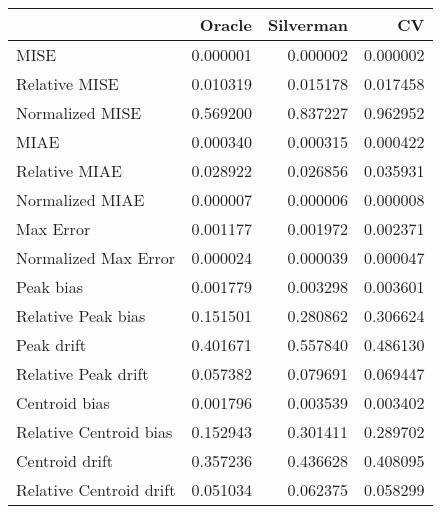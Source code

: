 \begin{tabular}{lrrr}
  \hline
 & Oracle & Silverman & CV \\ 
  \hline
MISE & 0.000001 & 0.000002 & 0.000002 \\ 
  Relative MISE & 0.010319 & 0.015178 & 0.017458 \\ 
  Normalized MISE & 0.569200 & 0.837227 & 0.962952 \\ 
  MIAE & 0.000340 & 0.000315 & 0.000422 \\ 
  Relative MIAE & 0.028922 & 0.026856 & 0.035931 \\ 
  Normalized MIAE & 0.000007 & 0.000006 & 0.000008 \\ 
  Max Error & 0.001177 & 0.001972 & 0.002371 \\ 
  Normalized Max Error & 0.000024 & 0.000039 & 0.000047 \\ 
  Peak bias & 0.001779 & 0.003298 & 0.003601 \\ 
  Relative Peak bias & 0.151501 & 0.280862 & 0.306624 \\ 
  Peak drift & 0.401671 & 0.557840 & 0.486130 \\ 
  Relative Peak drift & 0.057382 & 0.079691 & 0.069447 \\ 
  Centroid bias & 0.001796 & 0.003539 & 0.003402 \\ 
  Relative Centroid bias & 0.152943 & 0.301411 & 0.289702 \\ 
  Centroid drift & 0.357236 & 0.436628 & 0.408095 \\ 
  Relative Centroid drift & 0.051034 & 0.062375 & 0.058299 \\ 
   \hline
\end{tabular}

